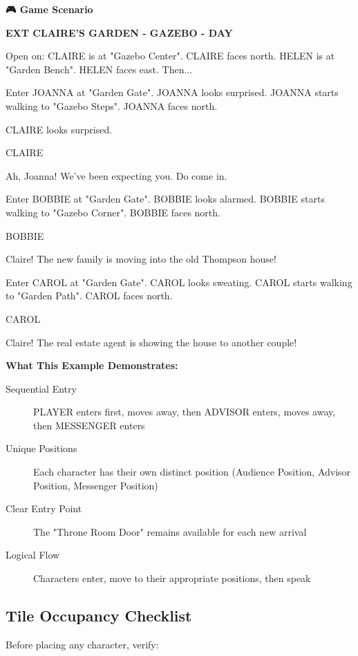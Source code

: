\documentclass[11pt,letterpaper,oldstylefigures]{memoir}
\newcommand{\slugline}[1]{\nobreak\textbf{\MakeUppercase{#1}}\par\nobreak\vspace{1\baselineskip}}
\newcommand{\speaker}[1]{\nobreak\hspace*{0.333\textwidth}\MakeUppercase{#1}\par\nobreak\vspace{0.5\baselineskip}}
\newcommand{\dialogue}[1]{\nobreak\hspace*{0.25\textwidth}\begin{minipage}{0.5\textwidth}#1\end{minipage}\par\vspace{1\baselineskip}}
\newcommand{\stagedir}[1]{#1\par\vspace{1\baselineskip}}
\newenvironment{FountainExample}
  {\begingroup
  \ttfamily\small
   \setlength{\parindent}{0pt}
  \setlength{\parskip}{0.5em}
  \allowdisplaybreaks
  \setlength{\displaywidowpenalty}{0}
  \setlength{\widowpenalty}{0}
  \setlength{\clubpenalty}{0}
  \setlength{\interlinepenalty}{0}
}
  {\endgroup}
\newenvironment{GameScenario}
{\begingroup
\small
\setlength{\parindent}{0pt}
\setlength{\parskip}{0.5em}
\allowdisplaybreaks
\setlength{\displaywidowpenalty}{0}
\setlength{\widowpenalty}{0}
\setlength{\clubpenalty}{0}
\setlength{\interlinepenalty}{0}
\begin{tcolorbox}[
    colback=orange!5,
    colframe=orange!75!black,
    boxrule=0.5pt,
    arc=2pt,
    left=0.5em,
    right=0.5em,
    top=0.25em,
    bottom=0.25em
]
\textbf{🎮 Game Scenario}
\end{tcolorbox}\par
}
{\endgroup}
\begin{document}
\begin{GameScenario}
\begin{FountainExample}
\slugline{EXT CLAIRE'S GARDEN - GAZEBO - DAY}

\stagedir{Open on: CLAIRE is at "Gazebo Center". CLAIRE faces north. HELEN is at "Garden Bench". HELEN faces east. Then...}
\stagedir{Enter JOANNA at "Garden Gate". JOANNA looks surprised. JOANNA starts walking to "Gazebo Steps". JOANNA faces north.}

\stagedir{CLAIRE looks surprised.}

\speaker{CLAIRE}
\dialogue{Ah, Joanna! We've been expecting you. Do come in.}

\stagedir{Enter BOBBIE at "Garden Gate". BOBBIE looks alarmed. BOBBIE starts walking to "Gazebo Corner". BOBBIE faces north.}

\speaker{BOBBIE}
\dialogue{Claire! The new family is moving into the old Thompson house!}

\stagedir{Enter CAROL at "Garden Gate". CAROL looks sweating. CAROL starts walking to "Garden Path". CAROL faces north.}

\speaker{CAROL}
\dialogue{Claire! The real estate agent is showing the house to another couple!}
\end{FountainExample}
\end{GameScenario}

\textbf{What This Example Demonstrates:}

\begin{description}
\item[Sequential Entry] PLAYER enters first, moves away, then ADVISOR enters, moves away, then MESSENGER enters
\item[Unique Positions] Each character has their own distinct position (Audience Position, Advisor Position, Messenger Position)
\item[Clear Entry Point] The "Throne Room Door" remains available for each new arrival
\item[Logical Flow] Characters enter, move to their appropriate positions, then speak
\end{description}

\subsection{Tile Occupancy Checklist}

Before placing any character, verify:
\end{document}
